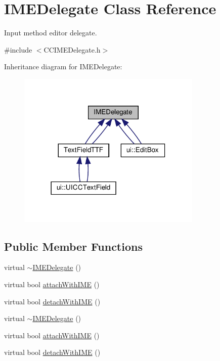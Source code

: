 \hypertarget{classIMEDelegate}{}\section{I\+M\+E\+Delegate Class Reference}
\label{classIMEDelegate}


Input method editor delegate.  




{\ttfamily \#include $<$C\+C\+I\+M\+E\+Delegate.\+h$>$}



Inheritance diagram for I\+M\+E\+Delegate\+:
\nopagebreak
\begin{figure}[H]
\begin{center}
\leavevmode
\includegraphics[width=249pt]{classIMEDelegate__inherit__graph}
\end{center}
\end{figure}
\subsection*{Public Member Functions}
\begin{DoxyCompactItemize}
\item 
virtual \hyperlink{classIMEDelegate_a06608d3afb55159c131943e270725a1a}{$\sim$\+I\+M\+E\+Delegate} ()
\item 
virtual bool \hyperlink{classIMEDelegate_a4033a961ddbd552473c82e73beaaf25b}{attach\+With\+I\+ME} ()
\item 
virtual bool \hyperlink{classIMEDelegate_a3a795a554801741e5adbc6ad91682479}{detach\+With\+I\+ME} ()
\item 
virtual \hyperlink{classIMEDelegate_afa055b78a3247e45bdc4f14498a38838}{$\sim$\+I\+M\+E\+Delegate} ()
\item 
virtual bool \hyperlink{classIMEDelegate_a081e3be4da413847937dd95b2d52dd57}{attach\+With\+I\+ME} ()
\item 
virtual bool \hyperlink{classIMEDelegate_aeb1e2cc292dc195dec7a3f83156f5dd9}{detach\+With\+I\+ME} ()
\end{DoxyCompactItemize}
